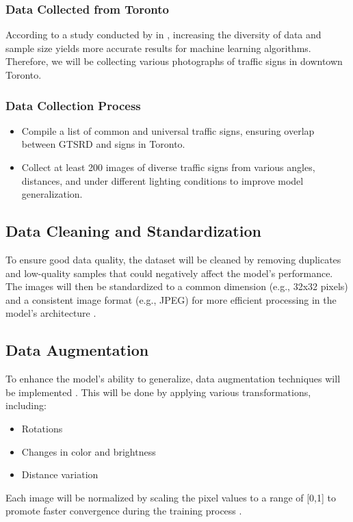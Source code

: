 \documentclass{article} %
\begin{document}
\subsubsection*{Data Collected from Toronto}
According to a study conducted by \citeauthor{sug2018performance} in \citeyear{sug2018performance}, increasing the diversity of data and sample size yields more accurate results for machine learning algorithms. Therefore, we will be collecting various photographs of traffic signs in downtown Toronto.

\subsubsection*{Data Collection Process}
\begin{itemize}
    \item Compile a list of common and universal traffic signs, ensuring overlap between GTSRD and signs in Toronto.
    \item Collect at least 200 images of diverse traffic signs from various angles, distances, and under different lighting conditions to improve model generalization.
\end{itemize}

\subsection{Data Cleaning and Standardization}
To ensure good data quality, the dataset will be cleaned by removing duplicates and low-quality samples that could negatively affect the model’s performance. The images will then be standardized to a common dimension (e.g., 32x32 pixels) and a consistent image format (e.g., JPEG) for more efficient processing in the model’s architecture \citep{obviouslyai_datacleaning}.

\subsection{Data Augmentation}
To enhance the model's ability to generalize, data augmentation techniques will be implemented \citep{datacamp_dataaugmentation}. This will be done by applying various transformations, including:
\begin{itemize}
    \item Rotations
    \item Changes in color and brightness
    \item Distance variation
\end{itemize}
Each image will be normalized by scaling the pixel values to a range of [0,1] to promote faster convergence during the training process \citep{datacamp_normalization}.
\end{document}
